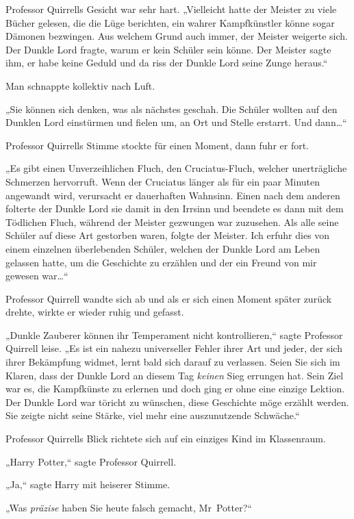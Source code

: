 {Professor Quirrells Gesicht war sehr hart. „Vielleicht hatte der Meister zu viele Bücher gelesen, die die Lüge berichten, ein wahrer Kampfkünstler könne sogar Dämonen bezwingen. Aus welchem Grund auch immer, der Meister weigerte sich. Der Dunkle Lord fragte, warum er kein Schüler sein könne. Der Meister sagte ihm, er habe keine Geduld und da riss der Dunkle Lord seine Zunge heraus.“

Man schnappte kollektiv nach Luft.

„Sie können sich denken, was als nächstes geschah. Die Schüler wollten auf den Dunklen Lord einstürmen und fielen um, an Ort und Stelle erstarrt. Und dann…“

Professor Quirrells Stimme stockte für einen Moment, dann fuhr er fort.

„Es gibt einen Unverzeihlichen Fluch, den Cruciatus-Fluch, welcher unerträgliche Schmerzen hervorruft. Wenn der Cruciatus länger als für ein paar Minuten angewandt wird, verursacht er dauerhaften Wahnsinn. Einen nach dem anderen folterte der Dunkle Lord sie damit in den Irrsinn und beendete es dann mit dem Tödlichen Fluch, während der Meister gezwungen war zuzusehen. Als alle seine Schüler auf diese Art gestorben waren, folgte der Meister. Ich erfuhr dies von einem einzelnen überlebenden Schüler, welchen der Dunkle Lord am Leben gelassen hatte, um die Geschichte zu erzählen und der ein Freund von mir gewesen war…“

Professor Quirrell wandte sich ab und als er sich einen Moment später zurück drehte, wirkte er wieder ruhig und gefasst.

„Dunkle Zauberer können ihr Temperament nicht kontrollieren,“ sagte Professor Quirrell leise. „Es ist ein nahezu universeller Fehler ihrer Art und jeder, der sich ihrer Bekämpfung widmet, lernt bald sich darauf zu verlassen. Seien Sie sich im Klaren, dass der Dunkle Lord an diesem Tag \emph{keinen} Sieg errungen hat. Sein Ziel war es, die Kampfkünste zu erlernen und doch ging er ohne eine einzige Lektion. Der Dunkle Lord war töricht zu wünschen, diese Geschichte möge erzählt werden. Sie zeigte nicht seine Stärke, viel mehr eine auszunutzende Schwäche.“

Professor Quirrells Blick richtete sich auf ein einziges Kind im Klassenraum.

„Harry Potter,“ sagte Professor Quirrell.

„Ja,“ sagte Harry mit heiserer Stimme.

„Was \emph{präzise} haben Sie heute falsch gemacht, Mr~Potter?“

}
